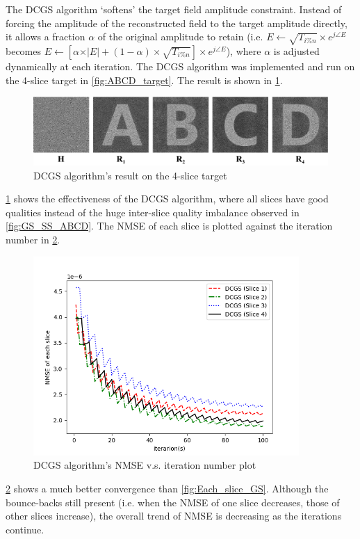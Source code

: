 The DCGS algorithm `softens' the target field amplitude constraint. Instead of forcing the amplitude of the reconstructed field to the target amplitude directly, it allows a fraction $\alpha$ of the original amplitude to retain (i.e. $E \gets \sqrt{T_{i\%n}} \times e^{j\angle E}$ becomes $E \gets [\alpha \times \vert E \vert + (1-\alpha) \times \sqrt{T_{i\%n}}] \times e^{j\angle E}$), where $\alpha$ is adjusted dynamically at each iteration. The DCGS algorithm was implemented and run on the 4-slice target in \cref{fig:ABCD_target}. The result is shown in \cref{fig:DCGS_ABCD}.

\begin{figure}[H]
  \centering
  \includegraphics[width=1.0\textwidth]{ABCD/DCGS_ABCD.pdf}
  \caption{DCGS algorithm's result on the 4-slice target}
  \label{fig:DCGS_ABCD}
\end{figure}

\cref{fig:DCGS_ABCD} shows the effectiveness of the DCGS algorithm, where all slices have good qualities instead of the huge inter-slice quality imbalance observed in \cref{fig:GS_SS_ABCD}. The NMSE of each slice is plotted against the iteration number in \cref{fig:Each_slice_DCGS}.

\begin{figure}[H]
  \centering
  \includegraphics[width=0.9\textwidth]{ABCD/Each_slice_DCGS.png}
  \caption{DCGS algorithm's NMSE v.s. iteration number plot}
  \label{fig:Each_slice_DCGS}
\end{figure}

\cref{fig:Each_slice_DCGS} shows a much better convergence than \cref{fig:Each_slice_GS}. Although the bounce-backs still present (i.e. when the NMSE of one slice decreases, those of other slices increase), the overall trend of NMSE is decreasing as the iterations continue.
